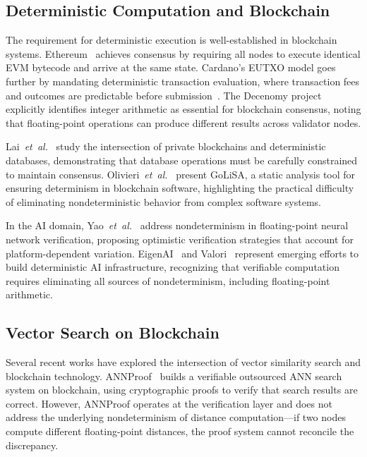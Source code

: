 \documentclass[10pt,journal,compsoc]{IEEEtran}
\newcommand{\etal}{\textit{et~al.}}
\begin{document}
\subsection{Deterministic Computation and Blockchain}

The requirement for deterministic execution is well-established in blockchain systems. Ethereum~\cite{buterin2014ethereum} achieves consensus by requiring all nodes to execute identical EVM bytecode and arrive at the same state. Cardano's EUTXO model goes further by mandating deterministic transaction evaluation, where transaction fees and outcomes are predictable before submission~\cite{cardano2024fees}. The Decenomy project~\cite{decenomy2024integer} explicitly identifies integer arithmetic as essential for blockchain consensus, noting that floating-point operations can produce different results across validator nodes.

Lai~\etal{}~\cite{lai2022blockchain} study the intersection of private blockchains and deterministic databases, demonstrating that database operations must be carefully constrained to maintain consensus. Olivieri~\etal{}~\cite{olivieri2022golisa} present GoLiSA, a static analysis tool for ensuring determinism in blockchain software, highlighting the practical difficulty of eliminating nondeterministic behavior from complex software systems.

In the AI domain, Yao~\etal{}~\cite{yao2025nao} address nondeterminism in floating-point neural network verification, proposing optimistic verification strategies that account for platform-dependent variation. EigenAI~\cite{alves2026eigenai} and Valori~\cite{gudur2025valori} represent emerging efforts to build deterministic AI infrastructure, recognizing that verifiable computation requires eliminating all sources of nondeterminism, including floating-point arithmetic.

\subsection{Vector Search on Blockchain}

Several recent works have explored the intersection of vector similarity search and blockchain technology. ANNProof~\cite{lu2024annproof} builds a verifiable outsourced ANN search system on blockchain, using cryptographic proofs to verify that search results are correct. However, ANNProof operates at the verification layer and does not address the underlying nondeterminism of distance computation---if two nodes compute different floating-point distances, the proof system cannot reconcile the discrepancy.
\end{document}
